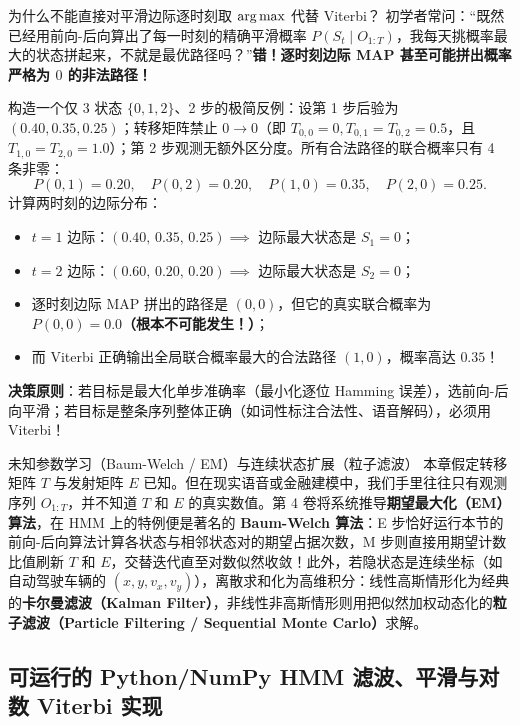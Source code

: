 \begin{failBox}{为什么不能直接对平滑边际逐时刻取 $\operatorname*{arg\,max}$ 代替 Viterbi？}
初学者常问：“既然已经用前向-后向算出了每一时刻的精确平滑概率 $P(S_t\mid O_{1:T})$，我每天挑概率最大的状态拼起来，不就是最优路径吗？”\textbf{错！逐时刻边际 MAP 甚至可能拼出概率严格为 $0$ 的非法路径！}

构造一个仅 3 状态 $\{0, 1, 2\}$、2 步的极简反例：设第 1 步后验为 $(0.40, 0.35, 0.25)$；转移矩阵禁止 $0\to 0$（即 $T_{0,0}=0, T_{0,1}=T_{0,2}=0.5$，且 $T_{1,0}=T_{2,0}=1.0$）；第 2 步观测无额外区分度。所有合法路径的联合概率只有 4 条非零：
\[
  P(0,1)=0.20,\quad P(0,2)=0.20,\quad P(1,0)=0.35,\quad P(2,0)=0.25.
\]
计算两时刻的边际分布：
\begin{itemize}
  \item $t=1$ 边际：$(0.40,\, 0.35,\, 0.25) \implies$ 边际最大状态是 $S_1 = 0$；
  \item $t=2$ 边际：$(0.60,\, 0.20,\, 0.20) \implies$ 边际最大状态是 $S_2 = 0$；
  \item 逐时刻边际 MAP 拼出的路径是 $(0, 0)$，但它的真实联合概率为 \textbf{$P(0, 0) = 0.0$（根本不可能发生！）}；
  \item 而 Viterbi 正确输出全局联合概率最大的合法路径 $(1, 0)$，概率高达 \textbf{$0.35$}！
\end{itemize}
\textbf{决策原则}：若目标是最大化单步准确率（最小化逐位 Hamming 误差），选前向-后向平滑；若目标是整条序列整体正确（如词性标注合法性、语音解码），必须用 Viterbi！
\end{failBox}

\begin{extBox}{未知参数学习（Baum-Welch / EM）与连续状态扩展（粒子滤波）}
本章假定转移矩阵 $T$ 与发射矩阵 $E$ 已知。但在现实语音或金融建模中，我们手里往往只有观测序列 $O_{1:T}$，并不知道 $T$ 和 $E$ 的真实数值。第 4 卷将系统推导\textbf{期望最大化（EM）算法}，在 HMM 上的特例便是著名的 \textbf{Baum-Welch 算法}：E 步恰好运行本节的前向-后向算法计算各状态与相邻状态对的期望占据次数，M 步则直接用期望计数比值刷新 $T$ 和 $E$，交替迭代直至对数似然收敛！此外，若隐状态是连续坐标（如自动驾驶车辆的 $(x, y, v_x, v_y)$），离散求和化为高维积分：线性高斯情形化为经典的\textbf{卡尔曼滤波（Kalman Filter）}，非线性非高斯情形则用把似然加权动态化的\textbf{粒子滤波（Particle Filtering / Sequential Monte Carlo）}求解。
\end{extBox}

\subsection{可运行的 Python/NumPy HMM 滤波、平滑与对数 Viterbi 实现}

